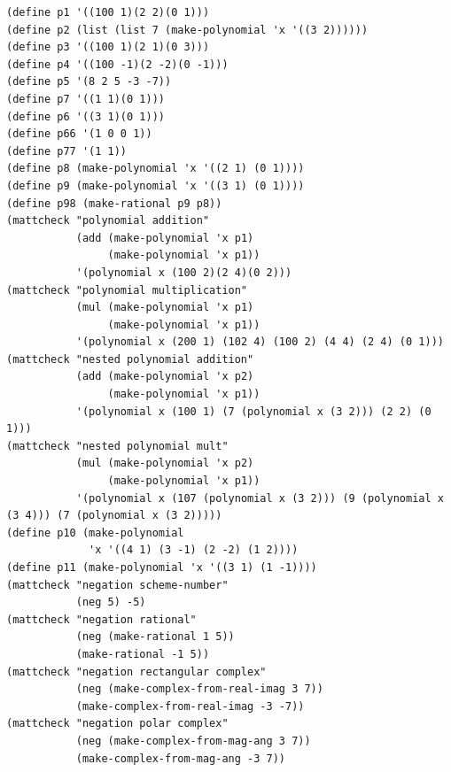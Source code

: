 \documentclass[final,fleqn,titlepage,twoside]{article}
\begin{document}
\begin{verbatim}
(define p1 '((100 1)(2 2)(0 1)))
(define p2 (list (list 7 (make-polynomial 'x '((3 2))))))
(define p3 '((100 1)(2 1)(0 3)))
(define p4 '((100 -1)(2 -2)(0 -1)))
(define p5 '(8 2 5 -3 -7))
(define p7 '((1 1)(0 1)))
(define p6 '((3 1)(0 1)))
(define p66 '(1 0 0 1))
(define p77 '(1 1))
(define p8 (make-polynomial 'x '((2 1) (0 1))))
(define p9 (make-polynomial 'x '((3 1) (0 1))))
(define p98 (make-rational p9 p8))
(mattcheck "polynomial addition"
           (add (make-polynomial 'x p1)
                (make-polynomial 'x p1))
           '(polynomial x (100 2)(2 4)(0 2)))
(mattcheck "polynomial multiplication"
           (mul (make-polynomial 'x p1)
                (make-polynomial 'x p1))
           '(polynomial x (200 1) (102 4) (100 2) (4 4) (2 4) (0 1)))
(mattcheck "nested polynomial addition"
           (add (make-polynomial 'x p2)
                (make-polynomial 'x p1))
           '(polynomial x (100 1) (7 (polynomial x (3 2))) (2 2) (0 1)))
(mattcheck "nested polynomial mult"
           (mul (make-polynomial 'x p2)
                (make-polynomial 'x p1))
           '(polynomial x (107 (polynomial x (3 2))) (9 (polynomial x (3 4))) (7 (polynomial x (3 2)))))
(define p10 (make-polynomial
             'x '((4 1) (3 -1) (2 -2) (1 2))))
(define p11 (make-polynomial 'x '((3 1) (1 -1))))
(mattcheck "negation scheme-number"
           (neg 5) -5)
(mattcheck "negation rational"
           (neg (make-rational 1 5))
           (make-rational -1 5))
(mattcheck "negation rectangular complex"
           (neg (make-complex-from-real-imag 3 7))
           (make-complex-from-real-imag -3 -7))
(mattcheck "negation polar complex"
           (neg (make-complex-from-mag-ang 3 7))
           (make-complex-from-mag-ang -3 7))


\end{verbatim}
\end{document}

